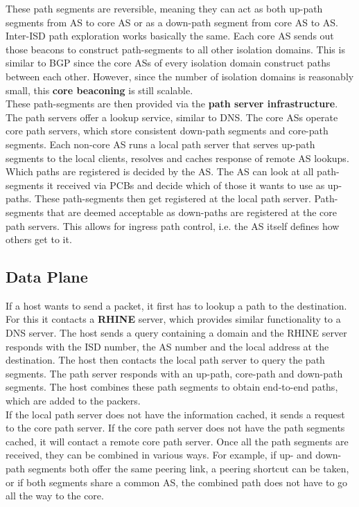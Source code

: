 These path segments are reversible, meaning they can act as both up-path segments from AS to core AS or as a down-path segment from core AS to AS.\\
Inter-ISD path exploration works basically the same. Each core AS sends out those beacons to construct path-segments to all other isolation domains. This is similar to BGP since the core ASs of every isolation domain construct paths between each other. However, since the number of isolation domains is reasonably small, this \textbf{core beaconing} is still scalable.\vspace{.3cm}\\

These path-segments are then provided via the \textbf{path server infrastructure}. The path servers offer a lookup service, similar to DNS. The core ASs operate core path servers, which store consistent down-path segments and core-path segments. Each non-core AS runs a local path server that serves up-path segments to the local clients, resolves and caches response of remote AS lookups.\\
Which paths are registered is decided by the AS. The AS can look at all path-segments it received via PCBs and decide which of those it wants to use as up-paths. These path-segments then get registered at the local path server. Path-segments that are deemed acceptable as down-paths are registered at the core path servers. This allows for ingress path control, i.e. the AS itself defines how others get to it.

\subsection{Data Plane}
If a host wants to send a packet, it first has to lookup a path to the destination. For this it contacts a \textbf{RHINE} server, which provides similar functionality to a DNS server. The host sends a query containing a domain and the RHINE server responds with the ISD number, the AS number and the local address at the destination. The host then contacts the local path server to query the path segments. The path server responds with an up-path, core-path and down-path segments. The host combines these path segments to obtain end-to-end paths, which are added to the packers.\\
If the local path server does not have the information cached, it sends a request to the core path server. If the core path server does not have the path segments cached, it will contact a remote core path server. Once all the path segments are received, they can be combined in various ways. For example, if up- and down-path segments both offer the same peering link, a peering shortcut can be taken, or if both segments share a common AS, the combined path does not have to go all the way to the core.\vspace{.3cm}\\

